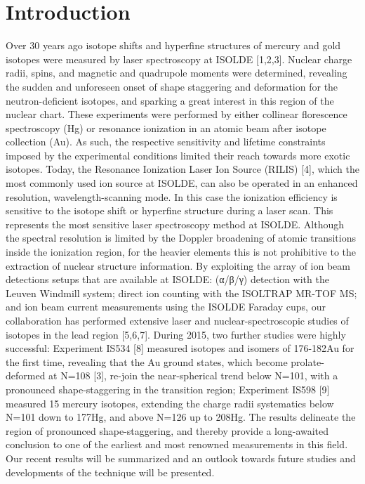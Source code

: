 \section{Introduction} 


Over 30 years ago isotope shifts and hyperfine structures of mercury and gold isotopes were measured by laser spectroscopy at ISOLDE [1,2,3]. Nuclear charge radii, spins, and magnetic and quadrupole moments were determined, revealing the sudden and unforeseen onset of shape staggering and deformation for the neutron-deficient isotopes, and sparking a great interest in this region of the nuclear chart.  These experiments were performed by either collinear florescence spectroscopy (Hg) or resonance ionization in an atomic beam after isotope collection (Au).  As such, the respective sensitivity and lifetime constraints imposed by the experimental conditions limited their reach towards more exotic isotopes.  Today, the Resonance Ionization Laser Ion Source (RILIS) [4], which the most commonly used ion source at ISOLDE, can also be operated in an enhanced resolution, wavelength-scanning mode. In this case the ionization efficiency is sensitive to the isotope shift or hyperfine structure during a laser scan.  This represents the most sensitive laser spectroscopy method at ISOLDE. Although the spectral resolution is limited by the Doppler broadening of atomic transitions inside the ionization region, for the heavier elements this is not prohibitive to the extraction of nuclear structure information.  By exploiting the array of ion beam detections setups that are available at ISOLDE: (α/β/γ) detection with the Leuven Windmill system; direct ion counting with the ISOLTRAP MR-TOF MS; and ion beam current measurements using the ISOLDE Faraday cups, our collaboration has performed extensive laser and nuclear-spectroscopic studies of isotopes in the lead region [5,6,7].  During 2015, two further studies were highly successful: Experiment IS534 [8] measured isotopes and isomers of 176-182Au for the first time, revealing that the Au ground states, which become prolate-deformed at N=108 [3], re-join the near-spherical trend below N=101, with a pronounced shape-staggering in the transition region; Experiment IS598 [9] measured 15 mercury isotopes, extending the charge radii systematics below N=101 down to 177Hg, and above N=126 up to 208Hg.  The results delineate the region of pronounced shape-staggering, and thereby provide a long-awaited conclusion to one of the earliest and most renowned measurements in this field.   Our recent results will be summarized and an outlook towards future studies and developments of the technique will be presented.